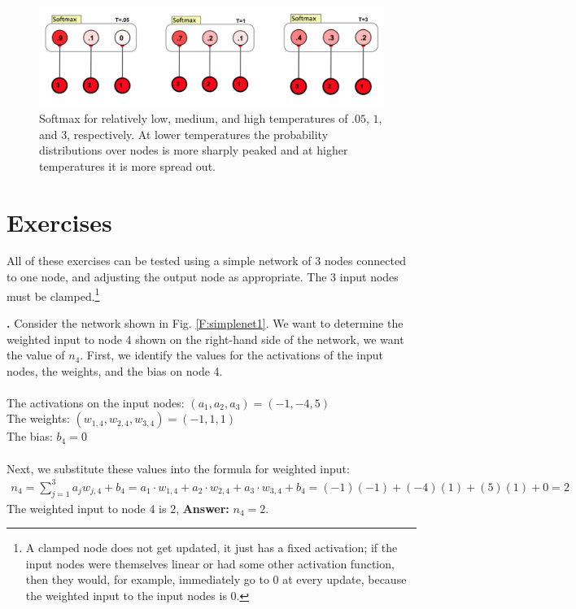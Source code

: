 \begin{figure}[h]
\centering
\includegraphics[scale=.4]{./images/softmaxDiffTemps.png}
\caption[Jeff Yoshimi.]{Softmax for relatively low, medium, and high temperatures of $.05$, $1$, and $3$, respectively. At lower temperatures the probability distributions over nodes is more sharply peaked and at higher temperatures it is more spread out.}
\label{softmaxTemps}
\end{figure}

\section{Exercises}\label{activation_function_exercises}

   All of these exercises can be tested using a simple network of 3 nodes connected to one node, and 
adjusting the output node as appropriate. The 3 input nodes must be clamped.\footnote{A clamped node does not get updated, it just has a fixed activation; if the input nodes were themselves linear or had some other activation function, then they would, for example, immediately go to 0 at every update, because the weighted input to the input nodes is 0.}
\bigskip


\noindent
{\bf \theActFunctionCounter.}  Consider the network shown in Fig. \ref{F:simplenet1}. We want to determine the weighted 
input to node 4 shown on the right-hand side of the network, \ie we want the
value of $n_4$. First, we identify the values for the activations of the input 
nodes, the weights, and the bias on node 4. \\ \\
\indent \qquad\qquad The activations on the input nodes: $(a_1,a_2,a_3) = 
(-1,-4,5)$ \\
\indent \qquad\qquad The weights: $(w_{1,4}, w_{2,4}, w_{3,4}) = (-1,1,1)$ \\
\indent \qquad\qquad The bias: $b_4 = 0$ \\ \\
Next, we substitute these values into the formula for weighted input:
\begin{eqnarray*}
n_4 = \sum_{j=1}^{3}  a_j  w_{j,4} + b_4 
    =  a_1 \cdot w_{1,4} + a_2 \cdot w_{2,4} + a_3 \cdot w_{3,4} + b_4 
    =      (-1)(-1)      +      (-4)(1)      +       (5)(1)      + 0 
    = 2
\end{eqnarray*}
The weighted input to node 4 is $2$, {\bf Answer:} $n_4=2$.
\bigskip

